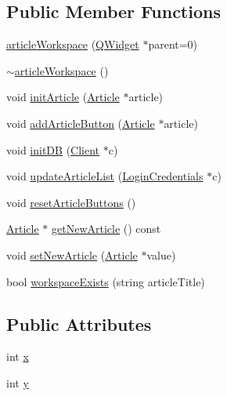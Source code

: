 \subsection*{Public Member Functions}
\begin{DoxyCompactItemize}
\item 
\hyperlink{classarticle_workspace_aa441890d4a8632c729567531b277d415}{article\+Workspace} (\hyperlink{class_q_widget}{Q\+Widget} $\ast$parent=0)
\item 
\hyperlink{classarticle_workspace_a1f0d200d967144d86273b1e362deeb20}{$\sim$article\+Workspace} ()
\item 
void \hyperlink{classarticle_workspace_a20ec9e01b96681d74004ce81249cb280}{init\+Article} (\hyperlink{class_article}{Article} $\ast$article)
\item 
void \hyperlink{classarticle_workspace_ad7fda7f14c95e55bc4596dc208bd9f6e}{add\+Article\+Button} (\hyperlink{class_article}{Article} $\ast$article)
\item 
void \hyperlink{classarticle_workspace_ab665b38e692c93276b94108d3a88c337}{init\+D\+B} (\hyperlink{class_client}{Client} $\ast$c)
\item 
void \hyperlink{classarticle_workspace_ab0636a16c5adbfd2a624ac9635ffa381}{update\+Article\+List} (\hyperlink{class_login_credentials}{Login\+Credentials} $\ast$c)
\item 
void \hyperlink{classarticle_workspace_a03bdfc2424a786b51a46d04c1426798e}{reset\+Article\+Buttons} ()
\item 
\hyperlink{class_article}{Article} $\ast$ \hyperlink{classarticle_workspace_aa8eb0c9f4aa89e4f0cc260edfcc49a94}{get\+New\+Article} () const 
\item 
void \hyperlink{classarticle_workspace_a2a602c58b89f1263e9ee78a1c1015686}{set\+New\+Article} (\hyperlink{class_article}{Article} $\ast$value)
\item 
bool \hyperlink{classarticle_workspace_a3404625169597df8daceb033cc64cf02}{workspace\+Exists} (string article\+Title)
\end{DoxyCompactItemize}
\subsection*{Public Attributes}
\begin{DoxyCompactItemize}
\item 
int \hyperlink{classarticle_workspace_a99462fde9a912cea8cdbf6ce4d15ae95}{x}
\item 
int \hyperlink{classarticle_workspace_aa790c78612eb2648187e5ba98282219d}{y}
\end{DoxyCompactItemize}



